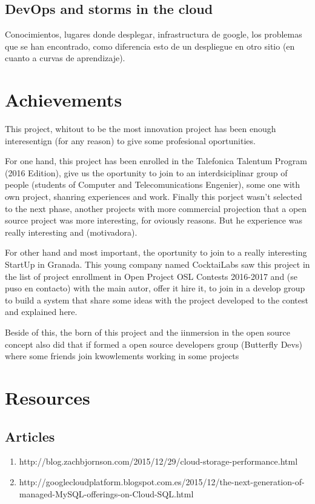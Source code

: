 \documentclass[oneside,english,titlepage]{scrbook}
\begin{document}
\section{DevOps and storms in the cloud}

Conocimientos, lugares donde desplegar, infrastructura de google,
los problemas que se han encontrado, como diferencia esto de un despliegue
en otro sitio (en cuanto a curvas de aprendizaje).

\chapter{Achievements}

This project, whitout to be the most innovation project has been enough interesentign (for any reason) to give some profesional oportunities.

For one hand, this project has been enrolled in the Talefonica Talentum Program (2016 Edition), give us the oportunity to join to an interdsiciplinar group of people (students of Computer and Telecomunications Engenier), some one with own project, shanring experiences and work. Finally this porject wasn't selected to the next phase, another projects with more commercial projection that a open source project was more interesting, for oviously reasons. But he experience was really interesting and (motivadora).

For other hand and most important, the oportunity to join to a really interesting StartUp in Granada. This young company named CocktaiLabs saw this project in the list of project enrollment in Open Project OSL Contests 2016-2017 and (se puso en contacto) with the main autor, offer it hire it, to join in a develop group to build a system that share some ideas with the project developed to the contest and explained here.

Beside of this, the born of this project and the iinmersion in the open source concept also did that if formed a open source developers group (Butterfly Devs) where some friends join kwowlements working in some projects


\chapter{Resources }

\section{Articles}
\begin{enumerate}
\item http://blog.zachbjornson.com/2015/12/29/cloud-storage-performance.html
\item http://googlecloudplatform.blogspot.com.es/2015/12/the-next-generation-of-managed-MySQL-offerings-on-Cloud-SQL.html
\end{enumerate}
\end{document}
